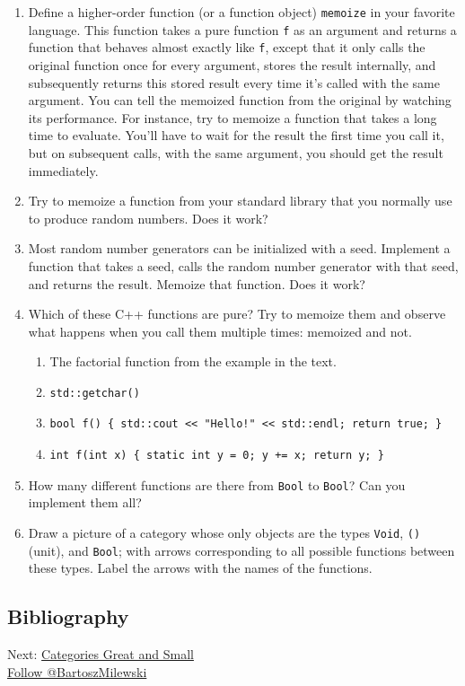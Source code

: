 \begin{enumerate}
\tightlist
\item
  Define a higher-order function (or a function object) \texttt{memoize}
  in your favorite language. This function takes a pure function
  \texttt{f} as an argument and returns a function that behaves almost
  exactly like \texttt{f}, except that it only calls the original
  function once for every argument, stores the result internally, and
  subsequently returns this stored result every time it's called with
  the same argument. You can tell the memoized function from the
  original by watching its performance. For instance, try to memoize a
  function that takes a long time to evaluate. You'll have to wait for
  the result the first time you call it, but on subsequent calls, with
  the same argument, you should get the result immediately.
\item
  Try to memoize a function from your standard library that you normally
  use to produce random numbers. Does it work?
\item
  Most random number generators can be initialized with a seed.
  Implement a function that takes a seed, calls the random number
  generator with that seed, and returns the result. Memoize that
  function. Does it work?
\item
  Which of these C++ functions are pure? Try to memoize them and observe
  what happens when you call them multiple times: memoized and not.

  \begin{enumerate}
  \item
    The factorial function from the example in the text.
  \item
\begin{verbatim}
std::getchar()
\end{verbatim}
  \item
\begin{verbatim}
bool f() { std::cout << "Hello!" << std::endl; return true; }
\end{verbatim}
  \item
\begin{verbatim}
int f(int x) { static int y = 0; y += x; return y; }
\end{verbatim}
  \end{enumerate}
\item
  How many different functions are there from \texttt{Bool} to
  \texttt{Bool}? Can you implement them all?
\item
  Draw a picture of a category whose only objects are the types
  \texttt{Void}, \texttt{()} (unit), and \texttt{Bool}; with arrows
  corresponding to all possible functions between these types. Label the
  arrows with the names of the functions.
\end{enumerate}

\subsection{Bibliography}\label{bibliography}

Next:
\href{https://bartoszmilewski.com/2014/12/05/categories-great-and-small/}{Categories
Great and Small}\\
\href{https://twitter.com/BartoszMilewski}{Follow @BartoszMilewski}
